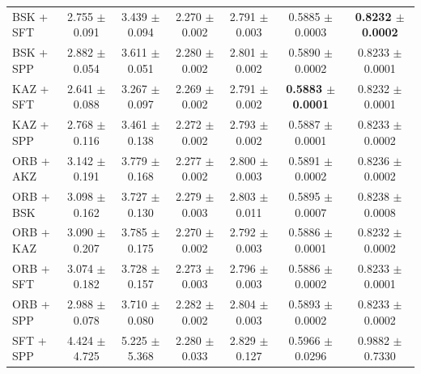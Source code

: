 \begin{table}[hbp]
\begin{tabular}{lcccccc}
BSK + SFT & 2.755 $\pm$ 0.091 & 3.439 $\pm$ 0.094 & 2.270 $\pm$ 0.002 & 2.791 $\pm$ 0.003 & 0.5885 $\pm$ 0.0003 & \textbf{0.8232 $\pm$ 0.0002} \\
BSK + SPP & 2.882 $\pm$ 0.054 & 3.611 $\pm$ 0.051 & 2.280 $\pm$ 0.002 & 2.801 $\pm$ 0.002 & 0.5890 $\pm$ 0.0002 & 0.8233 $\pm$ 0.0001 \\
KAZ + SFT & 2.641 $\pm$ 0.088 & 3.267 $\pm$ 0.097 & 2.269 $\pm$ 0.002 & 2.791 $\pm$ 0.002 & \textbf{0.5883 $\pm$ 0.0001} & 0.8232 $\pm$ 0.0001 \\
KAZ + SPP & 2.768 $\pm$ 0.116 & 3.461 $\pm$ 0.138 & 2.272 $\pm$ 0.002 & 2.793 $\pm$ 0.002 & 0.5887 $\pm$ 0.0001 & 0.8233 $\pm$ 0.0002 \\
ORB + AKZ & 3.142 $\pm$ 0.191 & 3.779 $\pm$ 0.168 & 2.277 $\pm$ 0.002 & 2.800 $\pm$ 0.003 & 0.5891 $\pm$ 0.0002 & 0.8236 $\pm$ 0.0002 \\
ORB + BSK & 3.098 $\pm$ 0.162 & 3.727 $\pm$ 0.130 & 2.279 $\pm$ 0.003 & 2.803 $\pm$ 0.011 & 0.5895 $\pm$ 0.0007 & 0.8238 $\pm$ 0.0008 \\
ORB + KAZ & 3.090 $\pm$ 0.207 & 3.785 $\pm$ 0.175 & 2.270 $\pm$ 0.002 & 2.792 $\pm$ 0.003 & 0.5886 $\pm$ 0.0001 & 0.8232 $\pm$ 0.0002 \\
ORB + SFT & 3.074 $\pm$ 0.182 & 3.728 $\pm$ 0.157 & 2.273 $\pm$ 0.003 & 2.796 $\pm$ 0.003 & 0.5886 $\pm$ 0.0002 & 0.8233 $\pm$ 0.0001 \\
ORB + SPP & 2.988 $\pm$ 0.078 & 3.710 $\pm$ 0.080 & 2.282 $\pm$ 0.002 & 2.804 $\pm$ 0.003 & 0.5893 $\pm$ 0.0002 & 0.8233 $\pm$ 0.0002 \\
SFT + SPP & 4.424 $\pm$ 4.725 & 5.225 $\pm$ 5.368 & 2.280 $\pm$ 0.033 & 2.829 $\pm$ 0.127 & 0.5966 $\pm$ 0.0296 & 0.9882 $\pm$ 0.7330 \\
\bottomrule
\end{tabular}
\end{table}